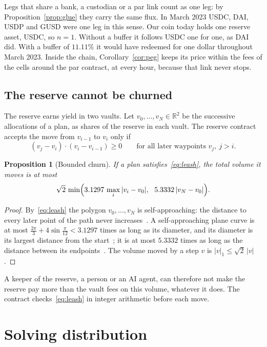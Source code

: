 \documentclass[11pt]{article}
\newtheorem{proposition}[theorem]{Proposition}
\theoremstyle{definition}
\theoremstyle{remark}
\newcommand{\R}{\mathbb{R}}
\begin{document}
Legs that share a bank, a custodian or a par link count as one leg: by Proposition~\ref{prop:glue} they carry the same flux. In March 2023 USDC, DAI, USDP and GUSD were one leg in this sense. Our coin today holds one reserve asset, USDC, so $n=1$. Without a buffer it follows USDC one for one, as DAI did. With a buffer of $11.11\%$ it would have redeemed for one dollar throughout March 2023. Inside the chain, Corollary~\ref{cor:peg} keeps its price within the fees of the cells around the par contract, at every hour, because that link never stops.

\subsection{The reserve cannot be churned}\label{sec:leash}

The reserve earns yield in two vaults. Let $v_0,\dots,v_N\in\R^2$ be the successive allocations of a plan, as shares of the reserve in each vault. The reserve contract accepts the move from $v_{i-1}$ to $v_i$ only if
\begin{equation}\label{eq:leash}
  (v_j-v_i)\cdot(v_i-v_{i-1})\ge0\qquad\text{for all later waypoints }v_j,\ j>i .
\end{equation}

\begin{proposition}[Bounded churn]\label{prop:leash}
If a plan satisfies~\eqref{eq:leash}, the total volume it moves is at most
\[
  \sqrt2\,\min\Bigl(3.1297\,\max_i|v_i-v_0|,\ \ 5.3332\,|v_N-v_0|\Bigr).
\]
\end{proposition}

\begin{proof}
By~\eqref{eq:leash} the polygon $v_0,\dots,v_N$ is self-approaching: the distance to every later point of the path never increases~\cite{LA}. A self-approaching plane curve is at most $\frac{2\pi}{3}+4\sin\frac{\pi}{12}<3.1297$ times as long as its diameter, and its diameter is its largest distance from the start~\cite{LA}; it is at most $5.3332$ times as long as the distance between its endpoints~\cite{IKL}. The volume moved by a step $v$ is $|v|_1\le\sqrt2\,|v|$.
\end{proof}

A keeper of the reserve, a person or an AI agent, can therefore not make the reserve pay more than the vault fees on this volume, whatever it does. The contract checks~\eqref{eq:leash} in integer arithmetic before each move.

\section{Solving distribution}
\end{document}
